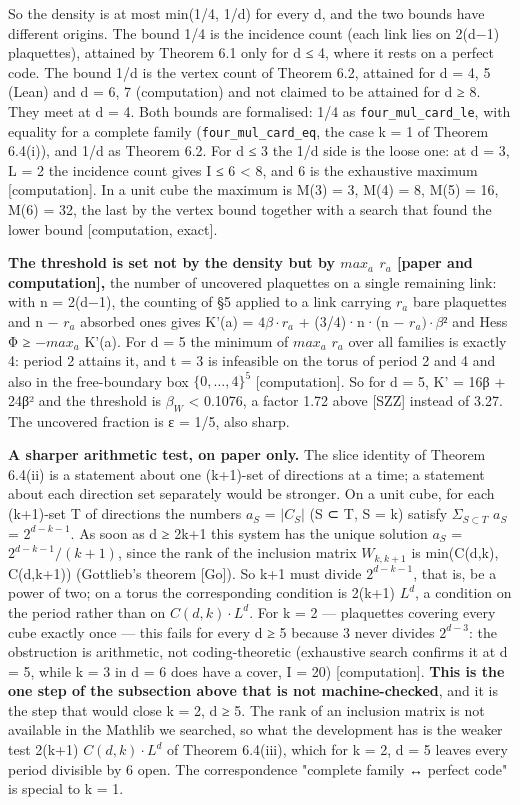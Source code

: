\documentclass[11pt,a4paper]{article}
\theoremstyle{named}
\begin{document}
So the density is at most min(1/4, 1/d) for every d, and the two bounds have different origins. The bound 1/4 is the incidence count (each link lies on 2(d−1) plaquettes), attained by Theorem 6.1 only for d ≤ 4, where it rests on a perfect code. The bound 1/d is the vertex count of Theorem 6.2, attained for d = 4, 5 (Lean) and d = 6, 7 (computation) and not claimed to be attained for d ≥ 8. They meet at d = 4. Both bounds are formalised: 1/4 as \texttt{four\_\allowbreak{}mul\_\allowbreak{}card\_\allowbreak{}le}, with equality for a complete family (\texttt{four\_\allowbreak{}mul\_\allowbreak{}card\_\allowbreak{}eq}, the case k = 1 of Theorem 6.4(i)), and 1/d as Theorem 6.2. For d ≤ 3 the 1/d side is the loose one: at d = 3, L = 2 the incidence count gives \textbar{}I\textbar{} ≤ 6 \textless{} 8, and 6 is the exhaustive maximum [computation]. In a unit cube the maximum is M(3) = 3, M(4) = 8, M(5) = 16, M(6) = 32, the last by the vertex bound together with a search that found the lower bound [computation, exact].

\textbf{The threshold is set not by the density but by $max_a$ $r_a$ [paper and computation],} the number of uncovered plaquettes on a single remaining link: with n = 2(d−1), the counting of §5 applied to a link carrying $r_a$ bare plaquettes and n − $r_a$ absorbed ones gives K'(a) = $4β·r_a$ + (3/4)·n·(n − $r_a)·β²$ and Hess Φ ≥ $−max_a$ K'(a). For d = 5 the minimum of $max_a$ $r_a$ over all families is exactly 4: period 2 attains it, and t = 3 is infeasible on the torus of period 2 and 4 and also in the free-boundary box $\{0,…,4\}^5$ [computation]. So for d = 5, K' = 16β + 24β² and the threshold is $β_W$ \textless{} 0.1076, a factor 1.72 above [SZZ] instead of 3.27. The uncovered fraction is ε = 1/5, also sharp.

\textbf{A sharper arithmetic test, on paper only.} The slice identity of Theorem 6.4(ii) is a statement about one (k+1)-set of directions at a time; a statement about each direction set separately would be stronger. On a unit cube, for each (k+1)-set T of directions the numbers $a_S$ = $|C_S|$ (S ⊂ T, \textbar{}S\textbar{} = k) satisfy $Σ_{S ⊂ T}$ $a_S$ = $2^{d−k−1}$. As soon as d ≥ 2k+1 this system has the unique solution $a_S$ = $2^{d−k−1}/(k+1)$, since the rank of the inclusion matrix $W_{k,k+1}$ is min(C(d,k), C(d,k+1)) (Gottlieb's theorem [Go]). So k+1 must divide $2^{d−k−1}$, that is, be a power of two; on a torus the corresponding condition is 2(k+1) \textbar{} $L^d$, a condition on the period rather than on $C(d,k)·L^d$. For k = 2 — plaquettes covering every cube exactly once — this fails for every d ≥ 5 because 3 never divides $2^{d−3}$: the obstruction is arithmetic, not coding-theoretic (exhaustive search confirms it at d = 5, while k = 3 in d = 6 does have a cover, \textbar{}I\textbar{} = 20) [computation]. \textbf{This is the one step of the subsection above that is not machine-checked}, and it is the step that would close k = 2, d ≥ 5. The rank of an inclusion matrix is not available in the Mathlib we searched, so what the development has is the weaker test 2(k+1) \textbar{} $C(d,k)·L^d$ of Theorem 6.4(iii), which for k = 2, d = 5 leaves every period divisible by 6 open. The correspondence "complete family ↔ perfect code" is special to k = 1.
\end{document}

